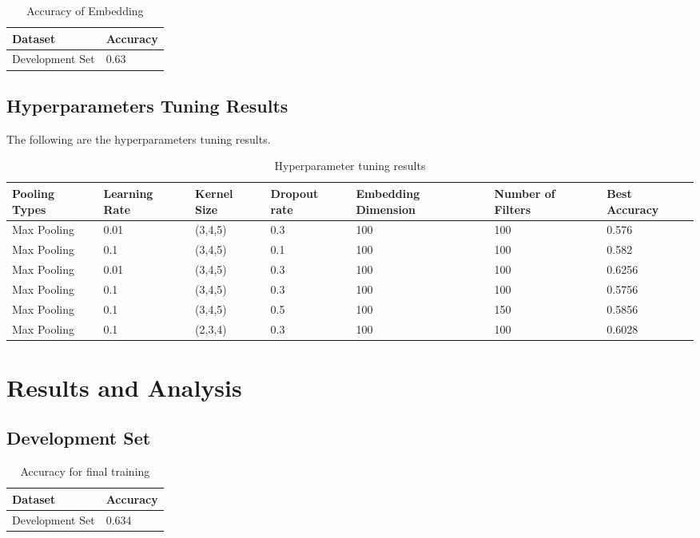 \documentclass{article}
\begin{document}
\begin{table}[htb]
	\caption{Accuracy of Embedding}
	\label{sample-table}
	\centering
	\begin{tabular}{ll}
		\toprule
		\cmidrule{1-2}
		Dataset &Accuracy\\
		\midrule
		Development Set & 0.63   \\
		\bottomrule
	\end{tabular}
\end{table}

\subsection{Hyperparameters Tuning Results}
The following are the hyperparameters tuning results.

\begin{table}[htb]
	\caption{Hyperparameter tuning results}
	\label{sample-table}
	\centering
	\begin{tabular}{lllllll}
		\toprule
		\cmidrule{1-7}
		Pooling Types & Learning Rate & Kernel Size & Dropout rate & Embedding Dimension 	& Number of Filters & Best Accuracy\\
		\midrule
		Max Pooling & 0.01  & (3,4,5) & 0.3 & 100 & 100 & 0.576 \\
		Max Pooling & 0.1  & (3,4,5) & 0.1 & 100 & 100 & 0.582 \\
		Max Pooling & 0.01  & (3,4,5) & 0.3 & 100 & 100 & 0.6256 \\
		Max Pooling & 0.1  & (3,4,5) & 0.3 & 100 & 100 & 0.5756 \\
		Max Pooling & 0.1  & (3,4,5) & 0.5 & 100 & 150 & 0.5856 \\
		Max Pooling & 0.1  & (2,3,4) & 0.3 & 100 & 100 & 0.6028 \\
		\bottomrule
	\end{tabular}
\end{table}

\pagebreak

\section{Results and Analysis}

\subsection{Development Set}

\begin{table}[htb]
	\caption{Accuracy for final training}
	\label{sample-table}
	\centering
	\begin{tabular}{ll}
		\toprule
		\cmidrule{1-2}
		Dataset & Accuracy\\
		\midrule
		Development Set & 0.634   \\
		\bottomrule
	\end{tabular}
\end{table}
\end{document}
